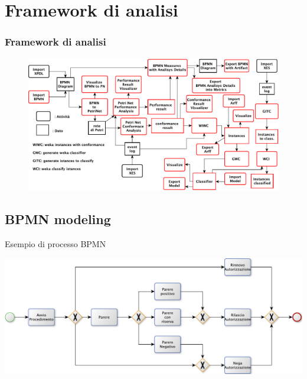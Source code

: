 \documentclass[10pt]{beamer}
\begin{document}
	\section{Framework di analisi}
	\begin{frame}
	\frametitle{Framework di analisi}
	\begin{figure}
	\centering 
	\includegraphics[scale=0.60]{./fig/PromPlugin_pres}
	\end{figure}
	\end{frame}
	
	
	
	\subsection{BPMN modeling}
	\begin{frame}{Esempio di processo BPMN}
	  
	  \begin{center}
	    \includegraphics[scale=0.55]{./fig/BPMN}
	  \end{center}
	\end{frame}
	
\end{document}
